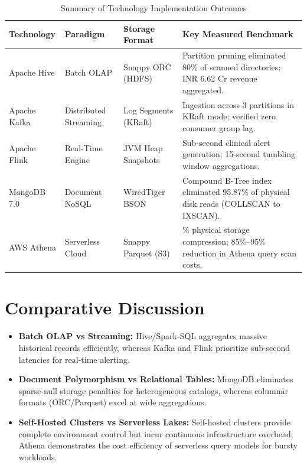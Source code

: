 \documentclass[12pt,a4paper]{report}
\begin{document}
\begin{table}[H]
\centering
\small
\caption{Summary of Technology Implementation Outcomes}
\label{tab:summary_outcomes}
\begin{tabularx}{\textwidth}{|>{\raggedright\arraybackslash}p{2.3cm}|>{\raggedright\arraybackslash}p{2.6cm}|>{\raggedright\arraybackslash}p{2.6cm}|>{\raggedright\arraybackslash}X|}
\hline
\textbf{Technology} & \textbf{Paradigm} & \textbf{Storage Format} & \textbf{Key Measured Benchmark}\\
\hline
Apache Hive & Batch OLAP & Snappy ORC (HDFS) & Partition pruning eliminated 80\% of scanned directories; INR 6.62 Cr revenue aggregated.\\
\hline
Apache Kafka & Distributed Streaming & Log Segments (KRaft) & Ingestion across 3 partitions in KRaft mode; verified zero consumer group lag.\\
\hline
Apache Flink & Real-Time Engine & JVM Heap Snapshots & Sub-second clinical alert generation; 15-second tumbling window aggregations.\\
\hline
MongoDB 7.0 & Document NoSQL & WiredTiger BSON & Compound B-Tree index eliminated 95.87\% of physical disk reads (COLLSCAN to IXSCAN).\\
\hline
AWS Athena & Serverless Cloud & Snappy Parquet (S3) & 66.63\% physical storage compression; 85\%--95\% reduction in Athena query scan costs.\\
\hline
\end{tabularx}
\end{table}

\section{Comparative Discussion}
\begin{itemize}
    \item \textbf{Batch OLAP vs Streaming:} Hive/Spark-SQL aggregates massive historical records efficiently, whereas Kafka and Flink prioritize sub-second latencies for real-time alerting.
    \item \textbf{Document Polymorphism vs Relational Tables:} MongoDB eliminates sparse-null storage penalties for heterogeneous catalogs, whereas columnar formats (ORC/Parquet) excel at wide aggregations.
    \item \textbf{Self-Hosted Clusters vs Serverless Lakes:} Self-hosted clusters provide complete environment control but incur continuous infrastructure overhead; Athena demonstrates the cost efficiency of serverless query models for bursty workloads.
\end{itemize}
\end{document}
